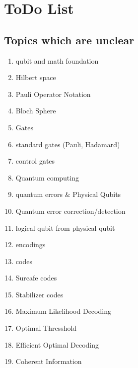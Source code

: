 \section{ToDo List}

\subsection{Topics which are unclear}

\begin{enumerate}
    \item qubit and math foundation
    \item Hilbert space
    \item Pauli Operator Notation
    \item Bloch Sphere
    \item Gates
    \item standard gates (Pauli, Hadamard)
    \item control gates
    \item Quantum computing 
    \item quantum errors \& Physical Qubits
    \item Quantum error correction/detection
    \item logical qubit from physical qubit
    \item encodings
    \item codes 
    \item Surcafe codes
    \item Stabilizer codes
    \item Maximum Likelihood Decoding 
    \item Optimal Thresshold
    \item Efficient Optimal Decoding
    \item Coherent Information



\end{enumerate}